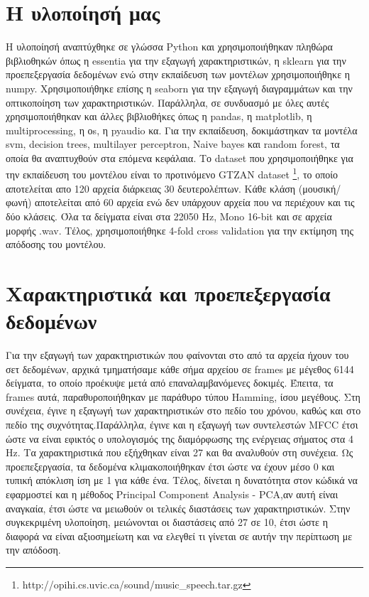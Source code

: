 \section{Η υλοποίησή μας}

Η υλοποίησή αναπτύχθηκε σε γλώσσα Python και χρησιμοποιήθηκαν πληθώρα βιβλιοθηκών όπως η essentia για την εξαγωγή χαρακτηριστικών, η sklearn για την προεπεξεργασία δεδομένων
ενώ στην εκπαίδευση των μοντέλων χρησιμοποιήθηκε η numpy. Χρησιμοποιήθηκε επίσης η  seaborn για την εξαγωγή διαγραμμάτων και την οπτικοποίηση των χαρακτηριστικών. Παράλληλα, σε συνδυασμό με όλες αυτές χρησιμοποιήθηκαν και άλλες βιβλιοθήκες όπως η pandas,  η matplotlib, η multiprocessing, η  οs, η pyaudio κα. Για την εκπαίδευση, δοκιμάστηκαν τα μοντέλα svm, decision trees, multilayer perceptron, Naive bayes και random forest, τα οποία θα αναπτυχθούν στα επόμενα κεφάλαια. Το dataset που χρησιμοποιήθηκε για την εκπαίδευση του μοντέλου είναι το προτινόμενο GTZAN dataset \footnote{http://opihi.cs.uvic.ca/sound/music\_speech.tar.gz}, το οποίο αποτελείται απο 120 αρχεία διάρκειας 30 δευτερολέπτων. Κάθε κλάση (μουσική/φωνή) αποτελείται από 60 αρχεία ενώ δεν υπάρχουν αρχεία που να περιέχουν και τις δύο κλάσεις. Όλα τα δείγματα είναι στα 22050 Hz, Mono 16-bit και σε αρχεία μορφής .wav. Τέλος, χρησιμοποιήθηκε 4-fold cross validation για την εκτίμηση της απόδοσης του μοντέλου.

\section{Χαρακτηριστικά και προεπεξεργασία δεδομένων}

Για την εξαγωγή των χαρακτηριστικών που φαίνονται στο από τα αρχεία ήχουν του σετ δεδομένων, αρχικά τμηματήσαμε κάθε σήμα αρχείου σε frames με μέγεθος 6144 δείγματα, το οποίο προέκυψε μετά από επαναλαμβανόμενες δοκιμές.
 Έπειτα, τα frames αυτά, παραθυροποιήθηκαν με παράθυρο τύπου Hamming, ίσου μεγέθους. Στη συνέχεια, έγινε η εξαγωγή των χαρακτηριστικών στο πεδίο του χρόνου, καθώς και στο πεδίο της συχνότητας.Παράλληλα, έγινε και η εξαγωγή των συντελεστών MFCC έτσι ώστε να είναι εφικτός ο υπολογισμός της διαμόρφωσης της ενέργειας σήματος στα 4 Ηz. Τα χαρακτηριστικά που εξήχθηκαν είναι 27 και θα αναλυθούν στη συνέχεια. Ως προεπεξεργασία, τα δεδομένα κλιμακοποιήθηκαν έτσι ώστε να έχουν μέσο 0 και τυπική απόκλιση ίση με 1 για κάθε ένα. Τέλος, δίνεται η δυνατότητα στον κώδικά να εφαρμοστεί και η μέθοδος Principal Component Analysis - PCA,αν αυτή είναι αναγκαία, έτσι ώστε να μειωθούν οι τελικές διαστάσεις των χαρακτηριστικών. Στην συγκεκριμένη υλοποίηση, μειώνονται οι διαστάσεις από 27 σε 10, έτσι ώστε η διαφορά να είναι αξιοσημείωτη και να ελεγθεί τι γίνεται σε αυτήν την περίπτωση με την απόδοση.  

